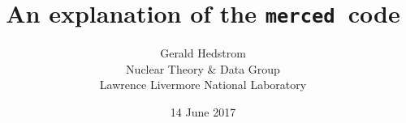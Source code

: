 \documentclass[11pt]{report}
\newcommand{\gettransfer}{\texttt{merced}}
\begin{document}
\title{An explanation of the \gettransfer\ code}
\author{Gerald Hedstrom\\
  Nuclear Theory \& Data Group\\
  Lawrence Livermore National Laboratory}
\date{14 June 2017}
\maketitle

\tableofcontents













\appendix


\end{document}
